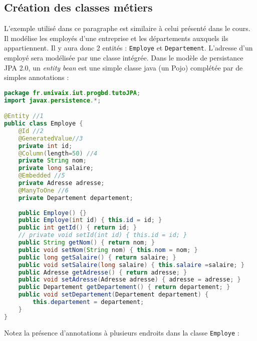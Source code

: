 \documentclass[a4paper,11pt]{article}
\begin{document}
\subsection{Création des classes métiers}
L'exemple utilisé dans ce paragraphe est similaire à celui présenté dans le cours. Il modélise les employés d'une 
entreprise et les départements auxquels ils appartiennent. Il y aura donc 2 entités : \texttt{Employe} et 
\texttt{Departement}. L'adresse d'un employé sera modélisée par une classe intégrée. Dans le modèle de persistance 
JPA 2.0, un \emph{entity bean} est une simple classe java (un Pojo) complétée par de simples annotations :
\begin{lstlisting}[language=Java,style=customjava]
package fr.univaix.iut.progbd.tutoJPA;
import javax.persistence.*;

@Entity //1
public class Employe {
	@Id //2
	@GeneratedValue//3
	private int id;
	@Column(length=50) //4
	private String nom;
	private long salaire;
	@Embedded //5
	private Adresse adresse;
	@ManyToOne //6
	private Departement departement;
	
	public Employe() {}
	public Employe(int id) { this.id = id; }
	public int getId() { return id; }
	// private void setId(int id) { this.id = id; }
	public String getNom() { return nom; }
	public void setNom(String nom) { this.nom = nom; }
	public long getSalaire() { return salaire; }
	public void setSalaire(long salaire) { this.salaire =salaire; }
	public Adresse getAdresse() { return adresse; }
	public void setAdresse(Adresse adresse) { adresse = adresse; }
	public Departement getDepartement() { return departement; }
	public void setDepartement(Departement departement) { 
		this.departement = departement; 
	}
}
\end{lstlisting}
Notez la présence d'annotations à plusieurs endroits dans la classe \texttt{Employe} :
\end{document}

